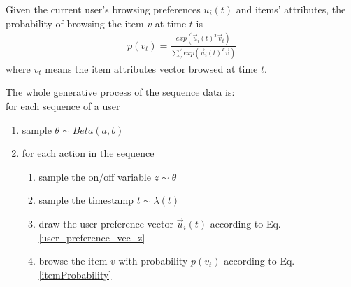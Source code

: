 \documentclass[11pt]{article}
\begin{document}

Given the current user's browsing preferences $u_i(t)$ and items' attributes, the probability of browsing the item $v$ at time $t$ is
\begin{align}\label{itemProbability}
p(v_t) = \frac{exp(\vec{u}_i(t)^T\vec{v}_t)}{\sum^V_v exp(\vec{u}_i(t)^T\vec{v})}
\end{align}
where $v_t$ means the item attributes vector browsed at time $t$. 

The whole generative process of the sequence data is: \\
for each sequence of a user 
\begin{enumerate} 
\item sample $\theta\sim Beta(a, b)$
\item for each action in the sequence
    \begin{enumerate}
    \item sample the on/off variable $z \sim \theta$
    \item sample the timestamp $t \sim \lambda(t)$
    \item draw the user preference vector $\vec{u}_i(t)$ according to  Eq.\ref{user_preference_vec_z}
    \item browse the item $v$ with probability $p(v_t)$ according to Eq.\ref{itemProbability}
    \end{enumerate}
\end{enumerate}
\end{document}
